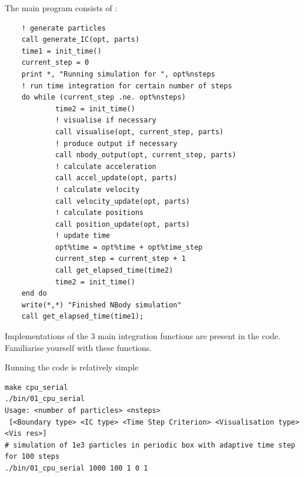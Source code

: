 \newpage
The main program consists of : 
\begin{center}
\begin{minipage}{0.95\textwidth}
\begin{verbatim}
    ! generate particles 
    call generate_IC(opt, parts)
    time1 = init_time()
    current_step = 0
    print *, "Running simulation for ", opt%nsteps
    ! run time integration for certain number of steps
    do while (current_step .ne. opt%nsteps)
            time2 = init_time()
            ! visualise if necessary 
            call visualise(opt, current_step, parts)
            ! produce output if necessary 
            call nbody_output(opt, current_step, parts)
            ! calculate acceleration 
            call accel_update(opt, parts)
            ! calculate velocity 
            call velocity_update(opt, parts)
            ! calculate positions 
            call position_update(opt, parts)
            ! update time 
            opt%time = opt%time + opt%time_step
            current_step = current_step + 1
            call get_elapsed_time(time2)
            time2 = init_time()
    end do 
    write(*,*) "Finished NBody simulation"
    call get_elapsed_time(time1);
\end{verbatim}
\end{minipage}
\end{center}
Implementations of the 3 main integration functions are present in the code. Familiarise yourself with these functions. 

\par 
Running the code is relatively simple  
\begin{center}
\begin{minipage}{0.95\textwidth}
\small
\begin{verbatim}
make cpu_serial
./bin/01_cpu_serial 
Usage: <number of particles> <nsteps>
 [<Boundary type> <IC type> <Time Step Criterion> <Visualisation type> <Vis res>]
# simulation of 1e3 particles in periodic box with adaptive time step for 100 steps  
./bin/01_cpu_serial 1000 100 1 0 1  
\end{verbatim}
\end{minipage}
\end{center}

